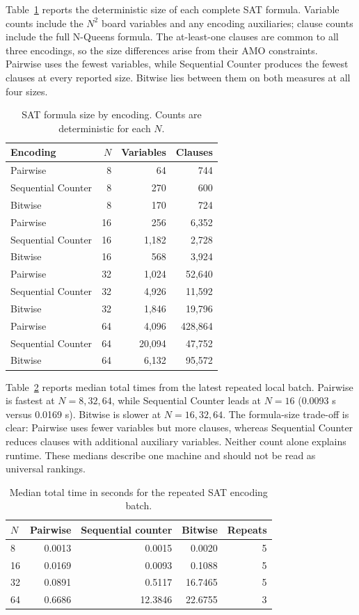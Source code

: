 \documentclass[a4paper,fleqn]{cas-sc}
\begin{document}
Table~\ref{tab:sat-size} reports the deterministic size of each complete SAT formula. Variable counts include the $N^2$ board variables and any encoding auxiliaries; clause counts include the full N-Queens formula. The at-least-one clauses are common to all three encodings, so the size differences arise from their AMO constraints. Pairwise uses the fewest variables, while Sequential Counter produces the fewest clauses at every reported size. Bitwise lies between them on both measures at all four sizes.

\begin{table}[width=.78\linewidth,cols=4,pos=ht]
\caption{SAT formula size by encoding. Counts are deterministic for each $N$.}
\label{tab:sat-size}
\begin{tabular}{lrrr}
\hline
Encoding & $N$ & Variables & Clauses \\
\hline
Pairwise & 8  & 64    & 744 \\
Sequential Counter & 8  & 270   & 600 \\
Bitwise & 8  & 170   & 724 \\
Pairwise & 16 & 256   & 6,352 \\
Sequential Counter & 16 & 1,182 & 2,728 \\
Bitwise & 16 & 568   & 3,924 \\
Pairwise & 32 & 1,024 & 52,640 \\
Sequential Counter & 32 & 4,926 & 11,592 \\
Bitwise & 32 & 1,846 & 19,796 \\
Pairwise & 64 & 4,096 & 428,864 \\
Sequential Counter & 64 & 20,094 & 47,752 \\
Bitwise & 64 & 6,132 & 95,572 \\
\hline
\end{tabular}
\end{table}

Table~\ref{tab:sat-summary} reports median total times from the latest repeated local batch. Pairwise is fastest at $N=8,32,64$, while Sequential Counter leads at $N=16$ (0.0093 s versus 0.0169 s). Bitwise is slower at $N=16,32,64$. The formula-size trade-off is clear: Pairwise uses fewer variables but more clauses, whereas Sequential Counter reduces clauses with additional auxiliary variables. Neither count alone explains runtime. These medians describe one machine and should not be read as universal rankings.

\begin{table}[width=.95\linewidth,cols=5,pos=ht]
\caption{Median total time in seconds for the repeated SAT encoding batch.}
\label{tab:sat-summary}
\begin{tabular}{lrrrr}
\hline
$N$ & Pairwise & Sequential counter & Bitwise & Repeats \\
\hline
8  & 0.0013 & 0.0015 & 0.0020 & 5 \\
16 & 0.0169 & 0.0093 & 0.1088 & 5 \\
32 & 0.0891 & 0.5117 & 16.7465 & 5 \\
64 & 0.6686 & 12.3846 & 22.6755 & 3 \\
\hline
\end{tabular}
\end{table}
\end{document}
